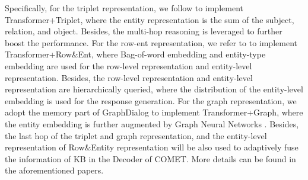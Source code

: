 \documentclass[11pt]{article}
\begin{document}
Specifically, for the triplet representation, we follow \cite{madotto-etal-2018-mem2seq, wu2018globaltolocal, qin-etal-2020-dynamic} to implement Transformer+Triplet, where the entity representation is the sum of the subject, relation, and object. Besides, the multi-hop reasoning \cite{sukhbaatar-2015-memory} is leveraged to further boost the performance. For the row-ent representation, we refer to \cite{gangi-reddy-etal-2019-multi, qin-etal-2019-entity} to implement Transformer+Row\&Ent, where Bag-of-word embedding and entity-type embedding are used for the row-level representation and entity-level representation. Besides, the row-level representation and entity-level representation are hierarchically queried, where the distribution of the entity-level embedding is used for the response generation. For the graph representation, we adopt the memory part of GraphDialog \cite{yang-etal-2020-graphdialog} to implement Transformer+Graph, where the entity embedding is further augmented by Graph Neural Networks \cite{velickovic2018graph}. 
Besides, the last hop of the triplet and graph representation, and the entity-level representation of Row\&Entity representation will be also used to adaptively fuse the information of KB in the Decoder of COMET.
More details can be found in the aforementioned papers.
\end{document}
